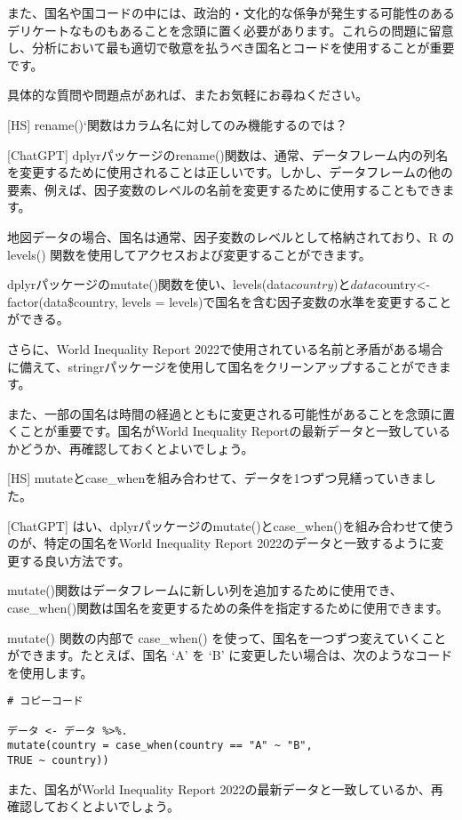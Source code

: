 \documentclass[
]{book}
\theoremstyle{definition}
\theoremstyle{definition}
\theoremstyle{definition}
\theoremstyle{definition}
\theoremstyle{remark}
\begin{document}
また、国名や国コードの中には、政治的・文化的な係争が発生する可能性のあるデリケートなものもあることを念頭に置く必要があります。これらの問題に留意し、分析において最も適切で敬意を払うべき国名とコードを使用することが重要です。

具体的な質問や問題点があれば、またお気軽にお尋ねください。

{[}HS{]} rename()`関数はカラム名に対してのみ機能するのでは？

{[}ChatGPT{]} dplyrパッケージのrename()関数は、通常、データフレーム内の列名を変更するために使用されることは正しいです。しかし、データフレームの他の要素、例えば、因子変数のレベルの名前を変更するために使用することもできます。

地図データの場合、国名は通常、因子変数のレベルとして格納されており、R の levels() 関数を使用してアクセスおよび変更することができます。

dplyrパッケージのmutate()関数を使い、levels(data\(country)とdata\)country\textless-factor(data\$country, levels = levels)で国名を含む因子変数の水準を変更することができる。

さらに、World Inequality Report 2022で使用されている名前と矛盾がある場合に備えて、stringrパッケージを使用して国名をクリーンアップすることができます。

また、一部の国名は時間の経過とともに変更される可能性があることを念頭に置くことが重要です。国名がWorld Inequality Reportの最新データと一致しているかどうか、再確認しておくとよいでしょう。

{[}HS{]} mutateとcase\_whenを組み合わせて、データを1つずつ見繕っていきました。

{[}ChatGPT{]} はい、dplyrパッケージのmutate()とcase\_when()を組み合わせて使うのが、特定の国名をWorld Inequality Report 2022のデータと一致するように変更する良い方法です。

mutate()関数はデータフレームに新しい列を追加するために使用でき、case\_when()関数は国名を変更するための条件を指定するために使用できます。

mutate() 関数の内部で case\_when() を使って、国名を一つずつ変えていくことができます。たとえば、国名 `A' を `B' に変更したい場合は、次のようなコードを使用します。

\begin{verbatim}
# コピーコード

データ <- データ %>%.
mutate(country = case_when(country == "A" ~ "B",
TRUE ~ country))
\end{verbatim}

また、国名がWorld Inequality Report 2022の最新データと一致しているか、再確認しておくとよいでしょう。
\end{document}
